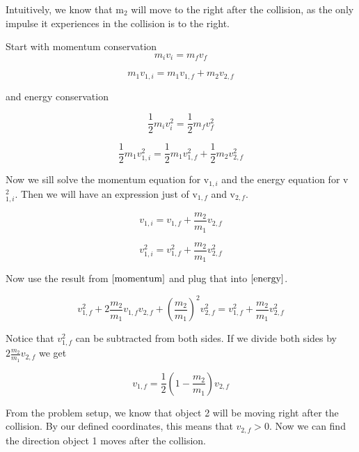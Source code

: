 \documentclass{article}
\begin{document}
	Intuitively, we know that m$_2$ will move to the right after the collision, as the only impulse it experiences in the collision is to the right.
	
	Start with momentum conservation
\begin{equation}
	m_i v_i = m_f v_f
\end{equation}

\begin{equation}
	m_1 v_{1,i} = m_1 v_{1,f} + m_2 v_{2,f}
\end{equation}

and energy conservation

\begin{equation}
	\frac{1}{2} m_i v_i^2 = \frac{1}{2} m_f v_f^2
\end{equation}

\begin{equation}
	\frac{1}{2} m_1 v_{1,i}^2 = \frac{1}{2} m_1 v_{1,f}^2 + \frac{1}{2} m_2 v_{2,f}^2
\end{equation}

Now we sill solve the momentum equation for v$_{1,i}$ and the energy equation for v$_{1,i}^2$. Then we will have an expression just of v$_{1,f}$ and v$_{2,f}$.

\begin{equation}
	v_{1,i} = v_{1,f} + \frac{m_2}{m_1} v_{2,f}
	\label{momentum}
\end{equation}

\begin{equation}
	v_{1,i}^2 = v_{1,f}^2 + \frac{m_2}{m_1} v_{2,f}^2
	\label{energy}
\end{equation}

Now use the result from $\ref{momentum}$ and plug that into $\ref{energy}$.

\begin{equation}
	v_{1,f}^2 + 2 \frac{m_2}{m_1} v_{1,f} v_{2,f} + \left( \frac{m_2}{m_1} \right)^2 v_{2,f}^2 = v_{1,f}^2 + \frac{m_2}{m_1} v_{2,f}^2
\end{equation}

Notice that $v_{1,f}^2$ can be subtracted from both sides. If we divide both sides by $2 \frac{m_2}{m_1} v_{2,f}$ we get

\begin{equation}
	v_{1,f} = \frac{1}{2} \left( 1 - \frac{m_2}{m_1} \right) v_{2,f}
	\label{v1f}
\end{equation}

From the problem setup, we know that object 2 will be moving right after the collision. By our defined coordinates, this means that $v_{2,f} > 0$. Now we can find the direction object 1 moves after the collision.
\end{document}
